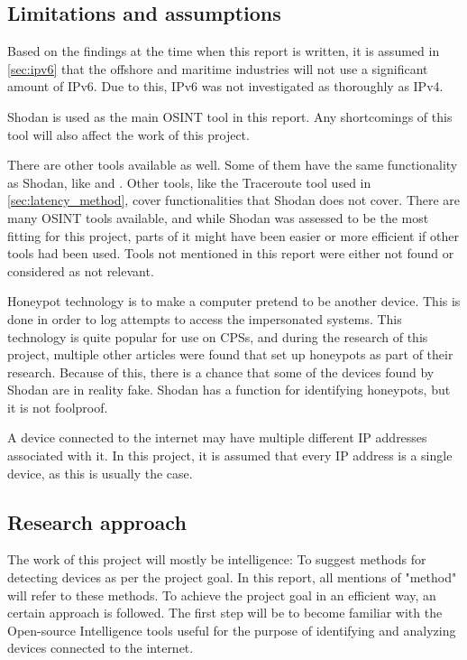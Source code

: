 \subsection{Limitations and assumptions} \label{sec:limits}
Based on the findings at the time when this report is written, it is assumed in \cref{sec:ipv6} that the offshore and maritime industries will not use a significant amount of IPv6. Due to this, IPv6 was not investigated as thoroughly as IPv4.

Shodan is used as the main OSINT tool in this report. Any shortcomings of this tool will also affect the work of this project.

There are other tools available as well. Some of them have the same functionality as Shodan, like \href{https://censys.io/}{\color{blue}{Censys}}\cite{censys} and \href{www.zoomeye.org}{\color{blue}{ZoomEye}}\cite{zoomeye}. Other tools, like the Traceroute tool used in \cref{sec:latency_method}, cover functionalities that Shodan does not cover. There are many OSINT tools available, and while Shodan was assessed to be the most fitting for this project, parts of it might have been easier or more efficient if other tools had been used. Tools not mentioned in this report were either not found or considered as not relevant.

Honeypot technology is to make a computer pretend to be another device. This is done in order to log attempts to access the impersonated systems. This technology is quite popular for use on CPSs, and during the research of this project, multiple other articles were found that set up honeypots as part of their research.\cite{bodenheim_butts_dunlap_mullins_2014}\cite{ICS_shodan_article} Because of this, there is a chance that some of the devices found by Shodan are in reality fake. Shodan has a function for identifying honeypots, but it is not foolproof.

A device connected to the internet may have multiple different IP addresses associated with it. In this project, it is assumed that every IP address is a single device, as this is usually the case.


\subsection{Research approach} \label{sec:research_approach}
The work of this project will mostly be intelligence: To suggest methods for detecting devices as per the project goal. In this report, all mentions of "method" will refer to these methods.
To achieve the project goal in an efficient way, an certain approach is followed.
The first step will be to become familiar with the Open-source Intelligence tools useful for the purpose of identifying and analyzing devices connected to the internet. 

